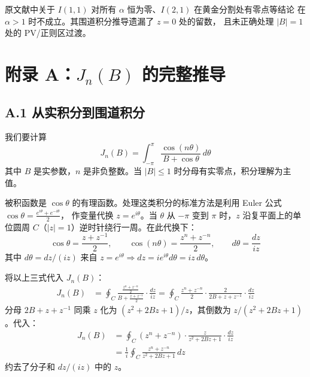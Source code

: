 \documentclass[12pt,a4paper]{ctexart}
\begin{document}
原文献中关于 $I(1,1)$ 对所有 $\alpha$ 恒为零、$I(2,1)$ 在黄金分割处有零点等结论
在 $\alpha>1$ 时不成立。其围道积分推导遗漏了 $z=0$ 处的留数，
且未正确处理 $|B|=1$ 处的 PV/正则区过渡。

\appendix

\section{附录 A：$J_n(B)$ 的完整推导}
\label{app:Jn}

\subsection*{A.1 从实积分到围道积分}

我们要计算
\begin{equation}
J_n(B)=\int_{-\pi}^{\pi}\frac{\cos(n\theta)}{B+\cos\theta}\,d\theta
\end{equation}
其中 $B$ 是实参数，$n$ 是非负整数。当 $|B|\leq1$ 时分母有实零点，积分理解为主值。

被积函数是 $\cos\theta$ 的有理函数。处理这类积分的标准方法是利用 Euler 公式
$\cos\theta=\frac{e^{i\theta}+e^{-i\theta}}{2}$，
作变量代换 $z=e^{i\theta}$。当 $\theta$ 从 $-\pi$ 变到 $\pi$ 时，$z$ 沿复平面上的单位圆周 $C$（$|z|=1$）逆时针绕行一周。在此代换下：
\begin{equation}
\cos\theta=\frac{z+z^{-1}}{2},\qquad
\cos(n\theta)=\frac{z^n+z^{-n}}{2},\qquad
d\theta=\frac{dz}{iz}
\end{equation}
其中 $d\theta=dz/(iz)$ 来自 $z=e^{i\theta}\Rightarrow dz=ie^{i\theta}d\theta=iz\,d\theta$。

将以上三式代入 $J_n(B)$：
\begin{equation}
\begin{aligned}
J_n(B)&=\oint_C\frac{\frac{z^n+z^{-n}}{2}}{B+\frac{z+z^{-1}}{2}}\cdot\frac{dz}{iz}
      =\oint_C\frac{z^n+z^{-n}}{2}\cdot\frac{2}{2B+z+z^{-1}}\cdot\frac{dz}{iz}
\end{aligned}
\end{equation}
分母 $2B+z+z^{-1}$ 同乘 $z$ 化为 $(z^2+2Bz+1)/z$，其倒数为 $z/(z^2+2Bz+1)$。代入：
\begin{equation}
\begin{aligned}
J_n(B)&=\oint_C(z^n+z^{-n})\cdot\frac{z}{z^2+2Bz+1}\cdot\frac{dz}{iz} \\[4pt]
&=\frac{1}{i}\oint_C\frac{z^n+z^{-n}}{z^2+2Bz+1}\,dz
\end{aligned}
\end{equation}
约去了分子和 $dz/(iz)$ 中的 $z$。
\end{document}
